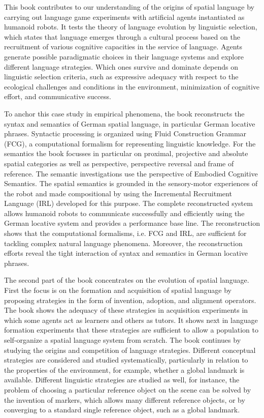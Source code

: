 
This book contributes to our understanding of the origins of spatial language
by carrying out language game experiments with artificial agents instantiated as
humanoid robots. It tests the theory of language evolution by linguistic selection,
which states that language emerges through a cultural process based on the recruitment of
various cognitive capacities in the service of language. Agents generate possible
paradigmatic choices in their language systems and explore different language strategies.
Which ones survive and dominate depends on linguistic selection criteria, such
as expressive adequacy with respect to the ecological challenges and conditions in the
environment, minimization of cognitive effort, and communicative success.

To anchor this case study in empirical phenomena,
the book reconstructs the syntax and semantics of German spatial language,
in particular German locative phrases. 
Syntactic processing is organized using Fluid Construction Grammar (FCG), 
a computational formalism for representing
linguistic knowledge. For the semantics the book focusses in particular
on proximal, projective and absolute spatial categories as well as perspective,
perspective reversal and frame of reference. The semantic investigations
use the perspective of Embodied Cognitive Semantics.
The spatial semantics is grounded in the sensory-motor experiences of the robot
and made compositional by using the Incremental Recruitment Language (IRL) developed
for this purpose. The complete reconstructed system allows humanoid robots to communicate successfully and efficiently using the German locative system and 
provides a performance base line. The reconstruction shows that the computational
formalisms, i.e. FCG and IRL, are sufficient for tackling complex natural language phenomena.
Moreover, the reconstruction efforts reveal the tight interaction of syntax and semantics 
in German locative phrases. 

The second part of the book concentrates on the evolution of spatial language.
First the focus is on the formation and acquisition of 
spatial language by proposing strategies in the form of invention, adoption, 
and alignment operators. The book shows the adequacy of these strategies 
in acquisition experiments in which some agents act as learners
and others as tutors. It shows next in language formation experiments
that these strategies are sufficient to allow a population to self-organize 
a spatial language system from scratch.
The book continues by studying the origins and competition of 
language strategies. Different conceptual strategies are considered and studied 
systematically, particularly in relation to
the properties of the environment, for example, whether a global landmark is available.
Different linguistic strategies are studied as well,
for instance, the problem of choosing a particular reference object on the scene can be solved
by the invention of markers, which allows many different reference objects, or by converging
to a standard single reference object, such as a global landmark.

